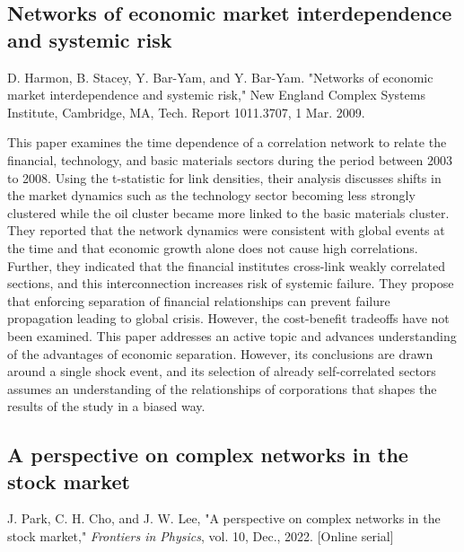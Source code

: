 \documentclass[12pt]{article}
\begin{document}
\subsection{Networks of economic market interdependence and systemic risk}
D. Harmon, B. Stacey, Y. Bar-Yam, and Y. Bar-Yam. "Networks of economic market interdependence and systemic risk," New England Complex Systems Institute, Cambridge, MA, Tech. Report 1011.3707, 1 Mar. 2009.
\newline

This paper examines the time dependence of a correlation network to relate the financial, technology, and basic materials sectors during the period between 2003 to 2008. Using the t-statistic for link densities, their analysis discusses shifts in the market dynamics such as the technology sector becoming less strongly clustered while the oil cluster became more linked to the basic materials cluster. They reported that the network dynamics were consistent with global events at the time and that economic growth alone does not cause high correlations. Further, they indicated that the financial institutes cross-link weakly correlated sections, and this interconnection increases risk of systemic failure. They propose that enforcing separation of financial relationships can prevent failure propagation leading to global crisis. However, the cost-benefit tradeoffs have not been examined. This paper addresses an active topic and advances understanding of the advantages of economic separation. However, its conclusions are drawn around a single shock event, and its selection of already self-correlated sectors assumes an understanding of the relationships of corporations that shapes the results of the study in a biased way.


\subsection{A perspective on complex networks in the stock market}
J. Park, C. H. Cho, and J. W. Lee, "A perspective on complex networks in the stock market," \textit{Frontiers in Physics}, vol. 10, Dec., 2022. [Online serial] %
\newline
\end{document}
